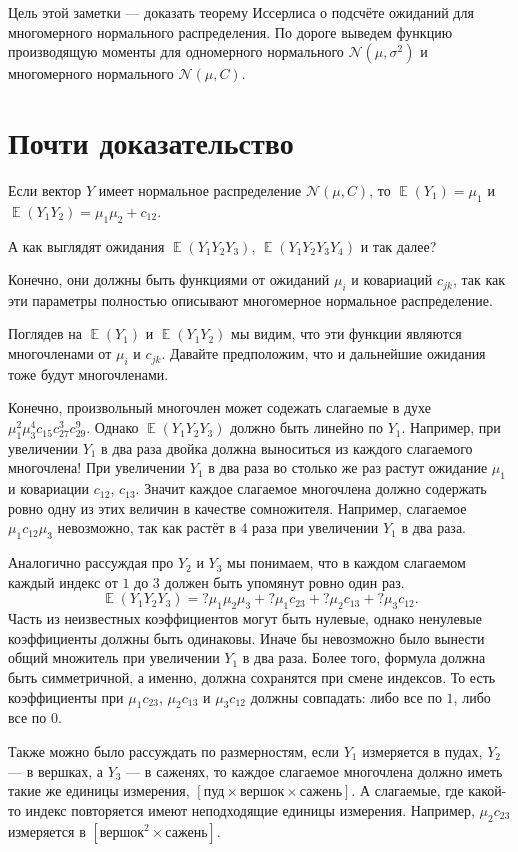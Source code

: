\documentclass[12pt]{article}
\DeclareMathOperator{\E}{\mathbb{E}}
\newcommand{\cN}{\mathcal{N}}
\begin{document}
Цель этой заметки — доказать теорему Иссерлиса о подсчёте ожиданий для многомерного нормального распределения.
По дороге выведем функцию производящую моменты для одномерного нормального $\cN(\mu, \sigma^2)$ и многомерного нормального $\cN(\mu, C)$.

\section*{Почти доказательство}

Если вектор $Y$ имеет нормальное распределение $\cN(\mu, C)$, то $\E(Y_1) = \mu_1$ и $\E(Y_1 Y_2) = \mu_1 \mu_2 + c_{12}$.

А как выглядят ожидания $\E(Y_1 Y_2 Y_3)$, $\E(Y_1 Y_2 Y_3 Y_4)$ и так далее?

Конечно, они должны быть функциями от ожиданий $\mu_i$ и ковариаций $c_{jk}$, так как эти параметры полностью описывают многомерное нормальное распределение. 

Поглядев на $\E(Y_1)$ и $\E(Y_1 Y_2)$ мы видим, что эти функции являются многочленами от $\mu_i$ и $c_{jk}$.
Давайте предположим, что и дальнейшие ожидания тоже будут многочленами.

Конечно, произвольный многочлен может содежать слагаемые в духе $\mu_1^2 \mu_3^4 c_{15} c_{27}^3 c_{29}^9$.
Однако $\E(Y_1 Y_2 Y_3)$ должно быть линейно по $Y_1$. 
Например, при увеличении $Y_1$ в два раза двойка должна выноситься из каждого слагаемого многочлена!
При увеличении $Y_1$ в два раза во столько же раз растут ожидание $\mu_1$ и ковариации $c_{12}$, $c_{13}$.
Значит каждое слагаемое многочлена должно содержать ровно одну из этих величин в качестве сомножителя.
Например, слагаемое $\mu_1 c_{12} \mu_3$ невозможно, так как растёт в $4$ раза при увеличении $Y_1$ в два раза.

Аналогично рассуждая про $Y_2$ и $Y_3$ мы понимаем, что в каждом слагаемом каждый индекс от $1$ до $3$ должен быть упомянут ровно один раз.
\[
\E(Y_1 Y_2 Y_3) = ? \mu_1 \mu_2 \mu_3 + ? \mu_1 c_{23} + ? \mu_2 c_{13} + ? \mu_3 c_{12}.
\]
Часть из неизвестных коэффициентов могут быть нулевые, однако ненулевые коэффициенты должны быть одинаковы. 
Иначе бы невозможно было вынести общий множитель при увеличении $Y_1$ в два раза. 
Более того, формула должна быть симметричной, а именно, должна сохранятся при смене индексов. 
То есть коэффициенты при $\mu_1 c_{23}$, $\mu_2 c_{13}$ и $\mu_3 c_{12}$ должны совпадать: либо все по $1$, либо все по $0$.

Также можно было рассуждать по размерностям, если $Y_1$ измеряется в пудах, $Y_2$ — в вершках, а $Y_3$ — в саженях, 
то каждое слагаемое многочлена должно иметь такие же единицы измерения, $[\text{пуд}\times \text{вершок} \times\text{сажень}]$. 
А слагаемые, где какой-то индекс повторяется имеют неподходящие единицы измерения. 
Например, $\mu_2 c_{23}$ измеряется в $[\text{вершок}^2 \times\text{сажень}]$. 
\end{document}
